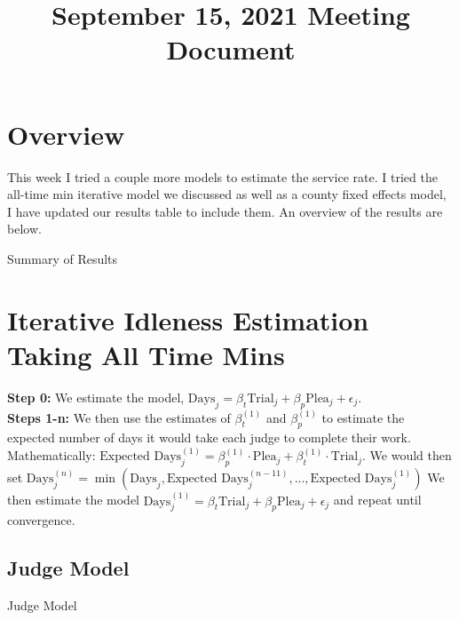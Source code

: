 \documentclass[11pt]{article}
\title{September 15, 2021 Meeting Document}
\begin{document}
\maketitle

\section{Overview}
  This week I tried a couple more models to estimate the service rate. I tried the all-time min iterative model we discussed as well as a county fixed effects model, I have updated our results table to include them.
  An overview of the results are below.

  \begin{table}[H]
    \centering
    \caption{Summary of Results}
    
  \end{table}

\section{Iterative Idleness Estimation Taking All Time Mins}
  \textbf{Step 0:} We estimate the model, $\text{Days}_j = \beta_t\text{Trial}_j + \beta_p\text{Plea}_j +\epsilon_j$. \\

  \noindent \textbf{Steps 1-n:} We then use the estimates of $\beta^{(1)}_t$ and $\beta^{(1)}_p$ to estimate the expected number
  of days it would take each judge to complete their work. Mathematically: $\text{Expected Days}^{(1)}_j = \beta^{(1)}_p \cdot \text{Plea}_j + \beta^{(1)}_t \cdot \text{Trial}_j$.
  We would then set $\text{Days}^{(n)}_j = \min(\text{Days}_j,\text{Expected Days}^{(n-11)}_j,...,\text{Expected Days}^{(1)}_j)$ We then estimate the model $\text{Days}^{(1)}_j = \beta_t\text{Trial}_j + \beta_p\text{Plea}_j +\epsilon_j$ and repeat until convergence.

  \subsection{Judge Model}

    \begin{table}[H]
      \centering
      \caption{Judge Model}
      
    \end{table}
\end{document}
